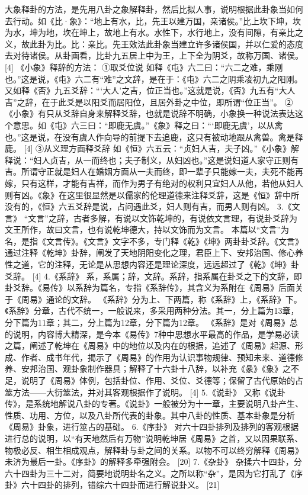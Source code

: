 \documentclass[a4paper,12pt,UTF8,twoside]{ctexbook}
\begin{document}
大象释卦的方法，是先用八卦之象解释卦，然后比拟人事，说明根据此卦象当如何去行动。如《比·象》：“地上有水，比，先王以建万国，亲诸侯。”比上坎下坤，坎为水，坤为地，坎在坤上，故地上有水。水性下，水行地上，没有间隙，有亲比之义，故此卦为比。比：亲比。先王效法此卦象当建立许多诸侯国，并以仁爱的态度去对待诸侯。从卦画看，比卦九五居上中为王，上下全为阴爻，故称万国、诸侯。 [4]
《小象》释辞的方法：
①取爻位说
如释《屯》六二曰：“六二之难，乘刚也。”这是说，《屯》六二有“难”之文辞，是在于：《屯》六二之阴乘凌初九之阳刚。
又如释《否》九五爻辞：“‘大人’之吉，位正当也。”这就是说，《否》九五有“大人吉”之辞，在于此爻是以阳爻而居阳位，且居外卦之中位，即所谓“位正当”。
②《小象》有只从爻辞自身来解释爻辞，也就是说辞不明确，小象换一种说法表达这个意思。如《屯》六三曰：“即鹿无虞。”《象》释之曰：“‘即鹿无虞’，以从禽也。”这是说，在没有虞人作向导的前提下去追鹿，这只有被动地跟从禽兽。禽是释鹿。 [4]
③从义理方面释爻辞
如《恒》六五云：“贞妇人吉，夫子凶。”《小象》解释说：“妇人贞吉，从一而终也；夫子制义，从妇凶也。”这是说妇道人家守正则有吉。所谓守正就是妇人在婚姻方面从一夫而终，即一辈子只能嫁一夫，夫死不能再嫁，只有这样，才能有吉祥，而作为男子有绝对的权利只宜妇人从他，若他从妇人则有凶。《象》在这里很显然是以儒家的伦理道德来注释爻辞，这是《恒》辞中所没有的，《恒》六五爻辞是说，占问遇此爻，妇人则有吉，而男人则有凶。
3.《文言》
“文言”之辞，古者多解，有说以文饰乾坤的，有说依文言理，有说卦爻辞为文王所作，故曰文言，也有说乾坤德大，持以文饰而为文言。
本篇以“文言”为名，是指《文言传》。《文言》文字不多，专门释《乾》《坤》两卦卦爻辞。《文言》通过注释《乾坤》卦辞，阐发了天地阴阳变化之理，君臣上下、安邦治国、修心养性之道，它的注释，无论是从思想内容还是理论深度，远远超过了《乾》《坤》卦爻辞。 [4]
4.《系辞》
系，系属；辞，文辞。系辞，指系属在卦爻之下的文辞，即卦爻辞。《易传》以系辞为篇名，专指《系辞传》，其含义为系附在《周易》后面关于《周易》通论的文辞。
《系辞》分为上、下两篇，称《系辞》上，《系辞》下。《系辞》分章，古代不统一，一般说来，多采用两种分法。其一，分上篇为13章，分下篇为11章；其二，分上篇为12章，分下篇为12章。
《系辞》是对《周易》总的说明，内容博大精深，是今本《易传》7种中思想水平最高的作品，是学易必读之篇，阐述了乾坤在《周易》中的地位以及内在的根据，追述了《周易》起源、形成、作者、成书年代，揭示了《周易》的作用为认识事物规律、预知未来、道德修养、安邦治国、观卦象制作器具；解释了十六卦十八辞，以补充《彖》《象》之不足，说明了《周易》体例，包括卦位、作用、爻位、爻德等；保留了古代原始的占筮方法——大衍筮法，并对其客观根据作了说明。 [4]
5.《说卦》
又称《说卦传》，是系统地解说八卦的专著。《说卦》一般被分为十一章，主要说明八卦产生、性质、功用、方位，以及八卦所代表的卦象。其中八卦的性质、基本卦象是分析《周易》卦象，进行筮占的基础。
6.《序卦》
对六十四卦排列及排列的客观根据进行总的说明，以“有天地然后有万物”说明乾坤居《周易》之首，又以因果联系、物极必反、相生相成观点，解释卦与卦之间的关系。以物不可以终穷解释《周易》未济为最后一卦。《序卦》的解释多牵强附会。 [20]
7.《杂卦》
杂揉六十四卦，分六十四卦为三十二对，简要地说明卦名之义。之所以称“杂”，是因为它打乱了《序卦》六十四卦的排列，错综六十四卦而进行解说卦义。 [21]
\end{document}
